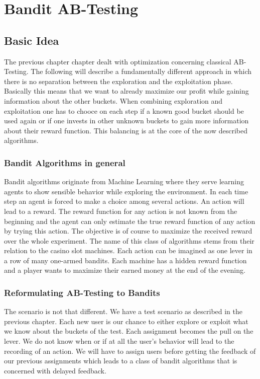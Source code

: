 \documentclass[main.tex]{subfiles}
\begin{document}
\chapter{Bandit AB-Testing}
\section{Basic Idea}
The previous chapter chapter dealt with optimization concerning classical AB-Testing. The following will describe a fundamentally different approach in which there is no separation between the exploration and the exploitation phase. Basically this means that we want to already maximize our profit while gaining information about the other buckets. When combining exploration and exploitation one has to chooce on each step if a known good bucket should be used again or if one invests in other unknown buckets to gain more information about their reward function. This balancing is at the core of the now described algorithms.

\subsection{Bandit Algorithms in general}
Bandit algorithms originate from Machine Learning where they serve learning agents to show sensible behavior while exploring the environment. In each time step an agent is forced to make a choice among several actions. An action will lead to a reward. The reward function for any action is not known from the beginning and the agent can only estimate the true reward function of any action by trying this action. The objective is of course to maximize the received reward over the whole experiment. The name of this class of algorithms stems from their relation to the casino slot machines. Each action can be imagined as one lever in a row of many one-armed bandits. Each machine has a hidden reward function and a player wants to maximize their earned money at the end of the evening.

\subsection{Reformulating AB-Testing to Bandits}
The scenario is not that different. We have a test scenario as described in the previous chapter. Each new user is our chance to either explore or exploit what we know about the buckets of the test. Each assignment becomes the pull on the lever. We do not know when or if at all the user's behavior will lead to the recording of an action. We will have to assign users before getting the feedback of our previous assignments which leads to a class of bandit algorithms that is concerned with delayed feedback.
\end{document}
